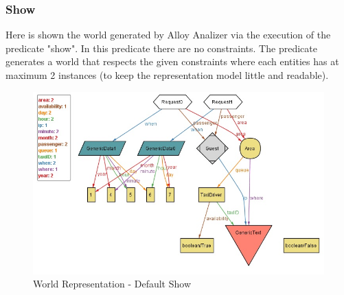 		\begin{landscape}
		\subsubsection{Show}
		Here is shown the world generated by Alloy Analizer via the
		execution of the predicate "show".
		In this predicate there are no constraints.
		The predicate generates a world that respects the given constraints where
		each entities has at maximum 2 instances (to keep the representation
		model little and readable).
			\begin{figure}[!h]
				\begin{center}			
					\includegraphics[height=0.65\textheight]{../SE2_ALLOY/Show}
					\caption{World Representation - Default Show}	
				\end{center}
			\end{figure}
		\end{landscape}
